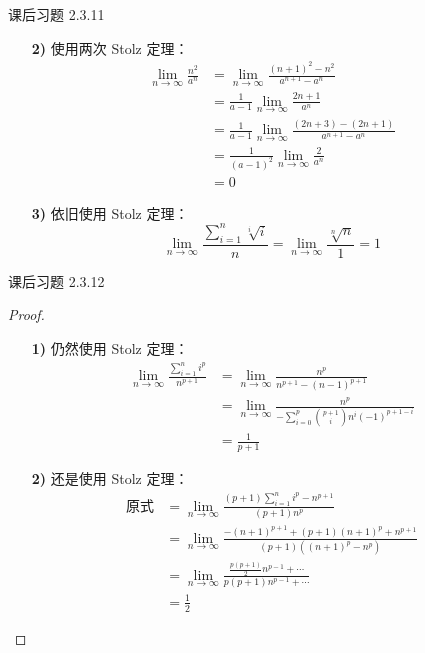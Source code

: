 \begin{problem}
	课后习题 2.3.11
	
	\begin{solution}
		\begin{enumerate}
			\item[\textbf{2)}] 使用两次 Stolz 定理：
			$$
			\begin{aligned}
				\lim_{n \to \infty} \frac{n^2}{a^n} & = \lim_{n \to \infty} \frac{(n+1)^2 - n^2}{a^{n+1} - a^n} \\
				& = \frac{1}{a - 1} \lim_{n \to \infty} \frac{2n + 1}{a^n} \\
				& = \frac{1}{a - 1} \lim_{n \to \infty} \frac{(2n + 3) - (2n + 1)}{a^{n+1} - a^n} \\
				& = \frac{1}{(a - 1)^2} \lim_{n \to \infty} \frac{2}{a^n} \\
				& = 0
			\end{aligned}
			$$

			\item[\textbf{3)}] 依旧使用 Stolz 定理：
			$$
			\lim_{n \to \infty} \frac{\sum_{i=1}^n \sqrt[i]{i}}{n} = \lim_{n \to \infty} \frac{\sqrt[n]{n}}{1} = 1
			$$
		\end{enumerate}
	\end{solution}
\end{problem}

\begin{problem}
	课后习题 2.3.12
	
	\begin{proof}
		\begin{enumerate}
			\item[\textbf{1)}] 仍然使用 Stolz 定理：
			$$
			\begin{aligned}
				\lim_{n \to \infty} \frac{\sum_{i=1}^n i^p}{n^{p+1}} & = \lim_{n \to \infty} \frac{n^p}{n^{p+1} - (n-1)^{p+1}} \\
				& = \lim_{n \to \infty} \frac{n^p}{-\sum_{i=0}^{p} \binom{p+1}{i} n^i (-1)^{p+1-i}} \\
				& = \frac{1}{p + 1}
			\end{aligned}
			$$

			\item[\textbf{2)}] 还是使用 Stolz 定理：
			$$
			\begin{aligned}
				\text{原式} & = \lim_{n \to \infty} \frac{(p + 1) \sum_{i=1}^n i^p - n^{p + 1}}{(p + 1) n^p} \\
				& = \lim_{n \to \infty} \frac{-(n + 1)^{p + 1} + (p + 1) (n + 1)^p + n^{p + 1}}{(p + 1) ((n + 1)^p - n^p)} \\
				& = \lim_{n \to \infty} \frac{\frac{p(p+1)}{2} n^{p - 1} + \cdots}{p(p + 1) n^{p - 1} + \cdots} \\
				& = \frac{1}{2}
			\end{aligned}
			$$
		\end{enumerate}
	\end{proof}
\end{problem}

